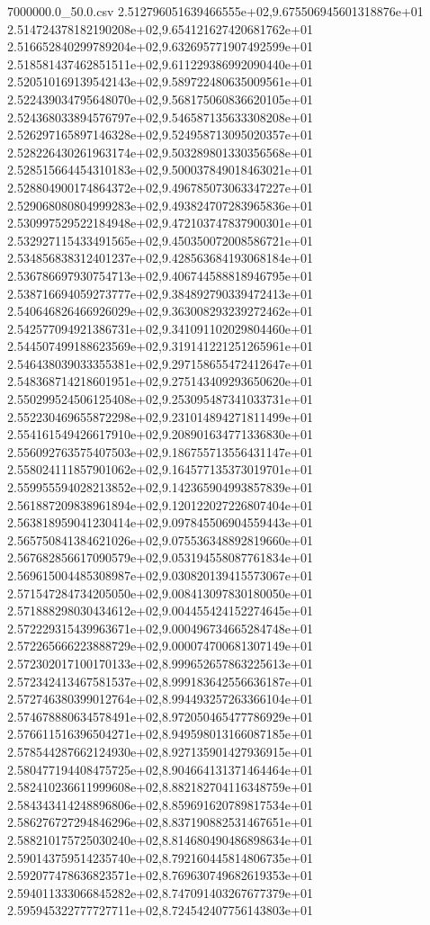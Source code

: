 \begin{filecontents*}{7000000.0_50.0.csv}
2.512796051639466555e+02,9.675506945601318876e+01
2.514724378182190208e+02,9.654121627420681762e+01
2.516652840299789204e+02,9.632695771907492599e+01
2.518581437462851511e+02,9.611229386992090440e+01
2.520510169139542143e+02,9.589722480635009561e+01
2.522439034795648070e+02,9.568175060836620105e+01
2.524368033894576797e+02,9.546587135633308208e+01
2.526297165897146328e+02,9.524958713095020357e+01
2.528226430261963174e+02,9.503289801330356568e+01
2.528515664454310183e+02,9.500037849018463021e+01
2.528804900174864372e+02,9.496785073063347227e+01
2.529068080804999283e+02,9.493824707283965836e+01
2.530997529522184948e+02,9.472103747837900301e+01
2.532927115433491565e+02,9.450350072008586721e+01
2.534856838312401237e+02,9.428563684193068184e+01
2.536786697930754713e+02,9.406744588818946795e+01
2.538716694059273777e+02,9.384892790339472413e+01
2.540646826466926029e+02,9.363008293239272462e+01
2.542577094921386731e+02,9.341091102029804460e+01
2.544507499188623569e+02,9.319141221251265961e+01
2.546438039033355381e+02,9.297158655472412647e+01
2.548368714218601951e+02,9.275143409293650620e+01
2.550299524506125408e+02,9.253095487341033731e+01
2.552230469655872298e+02,9.231014894271811499e+01
2.554161549426617910e+02,9.208901634771336830e+01
2.556092763575407503e+02,9.186755713556431147e+01
2.558024111857901062e+02,9.164577135373019701e+01
2.559955594028213852e+02,9.142365904993857839e+01
2.561887209838961894e+02,9.120122027226807404e+01
2.563818959041230414e+02,9.097845506904559443e+01
2.565750841384621026e+02,9.075536348892819660e+01
2.567682856617090579e+02,9.053194558087761834e+01
2.569615004485308987e+02,9.030820139415573067e+01
2.571547284734205050e+02,9.008413097830180050e+01
2.571888298030434612e+02,9.004455424152274645e+01
2.572229315439963671e+02,9.000496734665284748e+01
2.572265666223888729e+02,9.000074700681307149e+01
2.572302017100170133e+02,8.999652657863225613e+01
2.572342413467581537e+02,8.999183642556636187e+01
2.572746380399012764e+02,8.994493257263366104e+01
2.574678880634578491e+02,8.972050465477786929e+01
2.576611516396504271e+02,8.949598013166087185e+01
2.578544287662124930e+02,8.927135901427936915e+01
2.580477194408475725e+02,8.904664131371464464e+01
2.582410236611999608e+02,8.882182704116348759e+01
2.584343414248896806e+02,8.859691620789817534e+01
2.586276727294846296e+02,8.837190882531467651e+01
2.588210175725030240e+02,8.814680490486898634e+01
2.590143759514235740e+02,8.792160445814806735e+01
2.592077478636823571e+02,8.769630749682619353e+01
2.594011333066845282e+02,8.747091403267677379e+01
2.595945322777727711e+02,8.724542407756143803e+01

\end{filecontents*}
